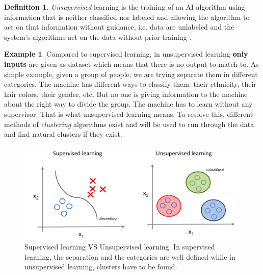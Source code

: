\documentclass[11pt, openany]{report}
\theoremstyle{plain}
\theoremstyle{definition}
\newtheorem{defn}{Definition}[section]
\newtheorem{exmp}{Example}[section]
\theoremstyle{remark}
\begin{document}
\begin{defn}
\textit{Unsupervised} learning is the training of an AI algorithm using information that is neither classified nor labeled and allowing the algorithm to act on that information without guidance, i.e. data are unlabeled and the system’s algorithms act on the data without prior training \cite{Unsupervised-1}. 
\end{defn}

\begin{exmp}
Compared to supervised learning, in unsupervised learning \textbf{only inputs} are given as dataset which means that there is no output to match to. As simple example, given a group of people, we are trying separate them in different categories. The machine has different ways to classify them: their ethnicity, their hair colors, their gender, etc. But no one is giving information to the machine about the right way to divide the group. The machine has to learn without any supervisor. That is what unsupervised learning means.   To resolve this, different methods of \textit{clustering} algorithms exist and will be used to run through the data and find natural clusters if they exist. %

\end{exmp}    

\begin{figure}[h]
  \centering
  \includegraphics[scale=0.32]{figures/supervised-unsupervised.png}
  \caption{Supervised learning VS Unsupervised learning. In supervised learning, the separation and the categories are well defined while in unsupervised learning, clusters have to be found. \cite{supervisedVSunsupervised-1}}
  \label{fig:supervised-unsupervised}
\end{figure}
\end{document}
